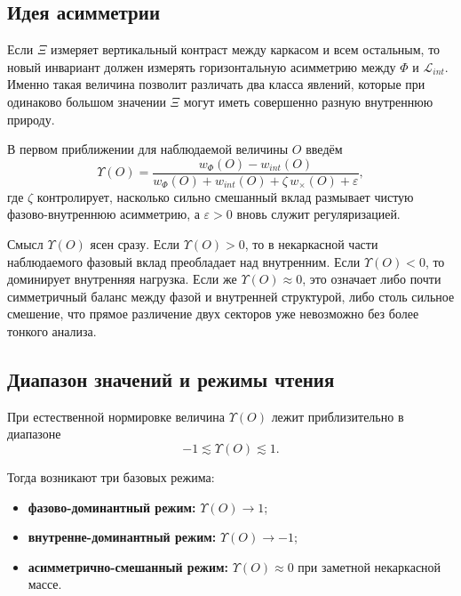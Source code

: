\documentclass[12pt,a4paper]{article}
\begin{document}
\subsection{Идея асимметрии}

Если \(\Xi\) измеряет вертикальный контраст между каркасом и всем остальным, то новый инвариант должен измерять горизонтальную асимметрию между \(\Phi\) и \(\mathcal{L}_{int}\). Именно такая величина позволит различать два класса явлений, которые при одинаково большом значении \(\Xi\) могут иметь совершенно разную внутреннюю природу.

В первом приближении для наблюдаемой величины \(O\) введём
\begin{equation}
\Upsilon(O) = \frac{w_{\Phi}(O) - w_{int}(O)}{w_{\Phi}(O) + w_{int}(O) + \zeta\, w_{\times}(O) + \varepsilon},
\end{equation}
где \(\zeta\) контролирует, насколько сильно смешанный вклад размывает чистую фазово-внутреннюю асимметрию, а \(\varepsilon > 0\) вновь служит регуляризацией.

Смысл \(\Upsilon(O)\) ясен сразу. Если \(\Upsilon(O) > 0\), то в некаркасной части наблюдаемого фазовый вклад преобладает над внутренним. Если \(\Upsilon(O) < 0\), то доминирует внутренняя нагрузка. Если же \(\Upsilon(O) \approx 0\), это означает либо почти симметричный баланс между фазой и внутренней структурой, либо столь сильное смешение, что прямое различение двух секторов уже невозможно без более тонкого анализа.

\subsection{Диапазон значений и режимы чтения}

При естественной нормировке величина \(\Upsilon(O)\) лежит приблизительно в диапазоне
\begin{equation}
-1 \lesssim \Upsilon(O) \lesssim 1.
\end{equation}

Тогда возникают три базовых режима:
\begin{itemize}
    \item \textbf{фазово-доминантный режим:} \(\Upsilon(O) \to 1\);
    \item \textbf{внутренне-доминантный режим:} \(\Upsilon(O) \to -1\);
    \item \textbf{асимметрично-смешанный режим:} \(\Upsilon(O) \approx 0\) при заметной некаркасной массе.
\end{itemize}
\end{document}

